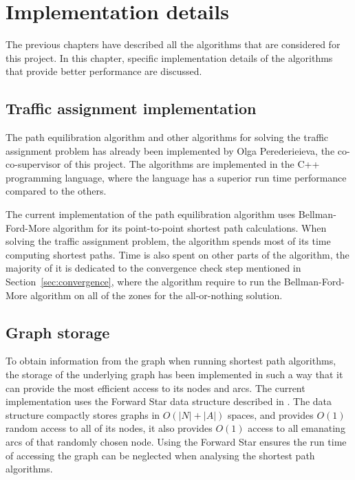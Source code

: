 \chapter{Implementation details} \label{chap:implementation}
The previous chapters have described all the algorithms that are considered for this project.
In this chapter, specific implementation details of the algorithms that provide better performance are discussed.

\section{Traffic assignment implementation}
The path equilibration algorithm and other algorithms for solving the traffic assignment problem has already been implemented by Olga Perederieieva, the co-co-supervisor of this project.
The algorithms are implemented in the C++ programming language,
where the language has a superior run time performance compared to the others.

The current implementation of the path equilibration algorithm uses Bellman-Ford-More algorithm for its point-to-point shortest path calculations.
When solving the traffic assignment problem,
the algorithm spends most of its time computing shortest paths.
Time is also spent on other parts of the algorithm,
the majority of it is dedicated to the convergence check step mentioned in Section~\ref{sec:convergence},
where the algorithm require to run the Bellman-Ford-More algorithm on all of the zones for the all-or-nothing solution.

\section{Graph storage}
To obtain information from the graph when running shortest path algorithms,
the storage of the underlying graph has been implemented in such a way that it can provide the most efficient access to its nodes and arcs.
The current implementation uses the Forward Star data structure described in \citet{Sheffi}.
The data structure compactly stores graphs in $O(|N|+|A|)$ spaces,
and provides $O(1)$ random access to all of its nodes,
it also provides $O(1)$ access to all emanating arcs of that randomly chosen node.
Using the Forward Star ensures the run time of accessing the graph can be neglected when analysing the shortest path algorithms.

